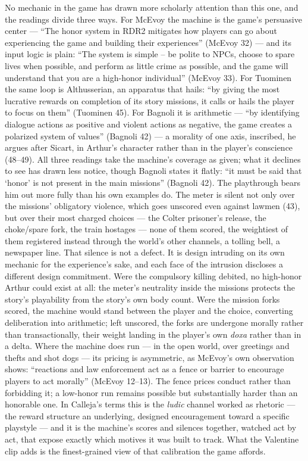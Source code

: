 No mechanic in the game has drawn more scholarly attention than this one, and the readings divide three ways. For McEvoy the machine is the game's persuasive center — ``The honor system in RDR2 mitigates how players can go about experiencing the game and building their experiences'' (McEvoy 32) — and its input logic is plain: ``The system is simple -- be polite to NPCs, choose to spare lives when possible, and perform as little crime as possible, and the game will understand that you are a high-honor individual'' (McEvoy 33). For Tuominen the same loop is Althusserian, an apparatus that hails: ``by giving the most lucrative rewards on completion of its story missions, it calls or hails the player to focus on them'' (Tuominen 45). For Bagnoli it is arithmetic — ``by identifying dialogue actions as positive and violent actions as negative, the game creates a polarized system of values'' (Bagnoli 42) — a morality of one axis, inscribed, he argues after Sicart, in Arthur's character rather than in the player's conscience (48--49). All three readings take the machine's coverage as given; what it declines to see has drawn less notice, though Bagnoli states it flatly: ``it must be said that `honor' is not present in the main missions'' (Bagnoli 42). The playthrough bears him out more fully than his own examples do. The meter is silent not only over the missions' obligatory violence, which goes unscored even against lawmen (43), but over their most charged choices — the Colter prisoner's release, the choke/spare fork, the train hostages — none of them scored, the weightiest of them registered instead through the world's other channels, a tolling bell, a newspaper line. That silence is not a defect. It is design intruding on its own mechanic for the experience's sake, and each face of the intrusion discloses a different design commitment. Were the compulsory killing debited, no high-honor Arthur could exist at all: the meter's neutrality inside the missions protects the story's playability from the story's own body count. Were the mission forks scored, the machine would stand between the player and the choice, converting deliberation into arithmetic; left unscored, the forks are undergone morally rather than transactionally, their weight landing in the player's own \textit{doxa} rather than in a delta. Where the machine does run — in the open world, over greetings and thefts and shot dogs — its pricing is asymmetric, as McEvoy's own observation shows: ``reactions and law enforcement act as a fence or barrier to encourage players to act morally'' (McEvoy 12--13). The fence prices conduct rather than forbidding it; a low-honor run remains possible but substantially harder than an honorable one. In Calleja's terms this is the \textit{ludic} channel worked as rhetoric — the reward structure an underlying, designed encouragement toward a specific playstyle — and it is the machine's scores and silences together, watched act by act, that expose exactly which motives it was built to track. What the Valentine clip adds is the finest-grained view of that calibration the game affords.

